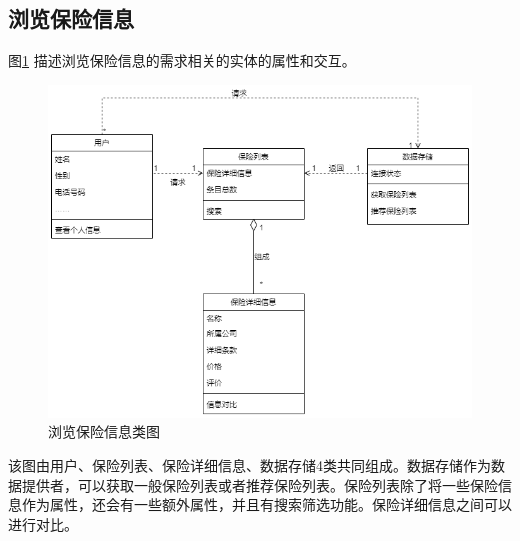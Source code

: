 \documentclass[a4paper]{ctexart}
\begin{document}
\subsection{浏览保险信息}
图\ref{fig:浏览保险信息类图} 描述浏览保险信息的需求相关的实体的属性和交互。
\begin{figure}[H]
\centering
\includegraphics[scale=0.4]{image/2_2类图.png}
\caption{浏览保险信息类图}
\label{fig:浏览保险信息类图}
\end{figure}
该图由用户、保险列表、保险详细信息、数据存储4类共同组成。数据存储作为数据提供者，可以获取一般保险列表或者推荐保险列表。保险列表除了将一些保险信息作为属性，还会有一些额外属性，并且有搜索筛选功能。保险详细信息之间可以进行对比。\\
\end{document}
